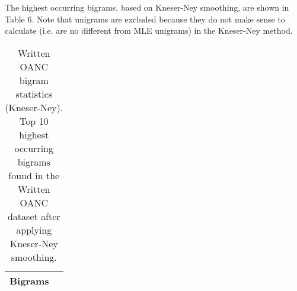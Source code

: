 \documentclass[11pt]{article}
\begin{document}
The highest occurring bigrams, based on Kneser-Ney smoothing, are shown in Table 6. Note
that unigrams are excluded because they do not make sense to calculate (i.e. are no different
from MLE unigrams) in the Kneser-Ney method.

\begin{table}[h]
\begin{center}
\begin{tabular}{|lr|}
\hline \bf Bigrams & \\ \hline

\hline
\end{tabular}
\end{center}
\caption{\label{tokenStats} Written OANC bigram statistics (Kneser-Ney).
Top 10 highest occurring bigrams found in the Written OANC dataset after
applying Kneser-Ney smoothing.}
\end{table}
\end{document}
